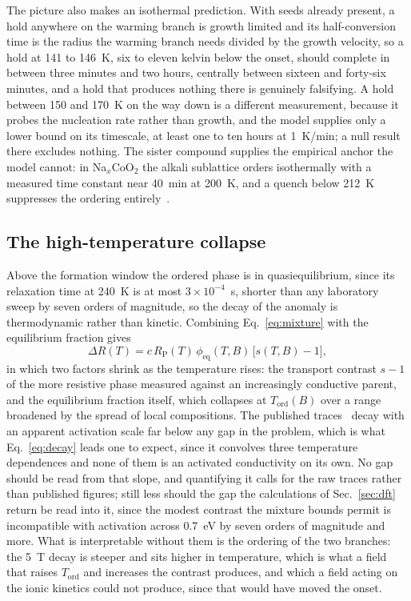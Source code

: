 \documentclass[reprint,twocolumn,prb,amsmath,amssymb,superscriptaddress,floatfix]{revtex4-2}
\newcommand{\Tcol}{T_{\mathrm{ord}}}
\begin{document}
The picture also makes an isothermal prediction. With seeds already present, a hold anywhere on
the warming branch is growth limited and its half-conversion time is the radius the warming
branch needs divided by the growth velocity, so a hold at 141 to 146~K, six to eleven kelvin
below the onset, should complete in between three minutes and two hours, centrally between
sixteen and forty-six minutes, and a hold that produces nothing there is genuinely falsifying. A
hold between 150 and 170~K on the way down is a different measurement, because it probes the
nucleation rate rather than growth, and the model supplies only a lower bound on its timescale,
at least one to ten hours at 1~K/min; a null result there excludes nothing. The sister compound
supplies the empirical anchor the model cannot: in Na$_x$CoO$_2$ the alkali sublattice orders
isothermally with a measured time constant near 40~min at 200~K, and a quench below 212~K
suppresses the ordering entirely~\cite{Schulze2008}.

\subsection{The high-temperature collapse}

Above the formation window the ordered phase is in quasiequilibrium, since its relaxation time
at 240~K is at most $3\times10^{-4}$~s, shorter than any laboratory sweep by seven orders of
magnitude,
so the decay of the anomaly is thermodynamic rather than kinetic. Combining Eq.~\eqref{eq:mixture} with the equilibrium
fraction gives
\begin{equation}
  \Delta R(T) = c\,R_{\mathrm{P}}(T)\,\phi_{\mathrm{eq}}(T,B)\,\bigl[s(T,B)-1\bigr],
  \label{eq:decay}
\end{equation}
in which two factors shrink as the temperature rises: the transport contrast $s-1$ of the more
resistive phase measured against an increasingly conductive parent, and the equilibrium fraction
itself, which collapses at $\Tcol(B)$ over a range broadened by the spread of local
compositions. The published traces~\cite{Crowley2020} decay with an apparent activation scale
far below any gap in the problem, which
is what Eq.~\eqref{eq:decay} leads one to expect, since it convolves three temperature
dependences and none of them is an activated conductivity on its own. No gap should be read from
that slope, and quantifying it calls for the raw traces rather than published figures; still
less should the gap the calculations of Sec.~\ref{sec:dft} return be read into it, since the
modest contrast the mixture bounds permit is incompatible with activation across 0.7~eV by seven
orders of magnitude and more. What is
interpretable without them is the ordering of the two branches: the 5~T decay is steeper and
sits higher in temperature, which is what a field that raises $\Tcol$ and increases the contrast
produces, and which a field acting on the ionic kinetics could not produce, since that would
have moved the onset.
\end{document}
